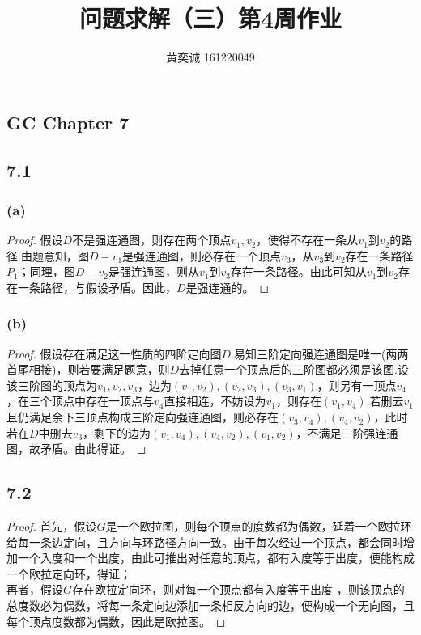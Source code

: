\documentclass[twocolumn]{article}
\newenvironment{SChinese}{%
	\CJKfamily{gbsn}%
	\CJKtilde
	\CJKnospace}{}
\begin{document}
	\begin{CJK}{UTF8}{}	
		\begin{SChinese}	
			\title{问题求解（三）第4周作业}
			\author{黄奕诚 161220049}
			\maketitle
			
			\section*{GC Chapter 7}
				\subsection*{7.1}
				\subsubsection*{(a)}
					\begin{proof}
						假设$D$不是强连通图，则存在两个顶点$v_1,v_2$，使得不存在一条从$v_1$到$v_2$的路径.由题意知，图$D-v_1$是强连通图，则必存在一个顶点$v_3$，从$v_3$到$v_2$存在一条路径$P_1$；同理，图$D-v_2$是强连通图，则从$v_1$到$v_3$存在一条路径。由此可知从$v_1$到$v_2$存在一条路径，与假设矛盾。因此，$D$是强连通的。
					\end{proof}
				\subsubsection*{(b)}
					\begin{proof}
						假设存在满足这一性质的四阶定向图$D$.易知三阶定向强连通图是唯一(两两首尾相接)，则若要满足题意，则$D$去掉任意一个顶点后的三阶图都必须是该图.设该三阶图的顶点为$v_1,v_2,v_3$，边为$(v_1,v_2),(v_2,v_3),(v_3,v_1)$，则另有一顶点$v_4$，在三个顶点中存在一顶点与$v_4$直接相连，不妨设为$v_1$，则存在$(v_1,v_4)$.若删去$v_1$且仍满足余下三顶点构成三阶定向强连通图，则必存在$(v_3,v_4),(v_4,v_2)$，此时若在$D$中删去$v_3$，剩下的边为$(v_1,v_4),(v_4,v_2),(v_1,v_2)$，不满足三阶强连通图，故矛盾。由此得证。
					\end{proof}
				\subsection*{7.2}
					\begin{proof}
						首先，假设$G$是一个欧拉图，则每个顶点的度数都为偶数，延着一个欧拉环给每一条边定向，且方向与环路径方向一致。由于每次经过一个顶点，都会同时增加一个入度和一个出度，由此可推出对任意的顶点，都有入度等于出度，便能构成一个欧拉定向环，得证；\\
						再者，假设$G$存在欧拉定向环，则对每一个顶点都有入度等于出度 ，则该顶点的总度数必为偶数，将每一条定向边添加一条相反方向的边，便构成一个无向图，且每个顶点度数都为偶数，因此是欧拉图。
					\end{proof}

\end{SChinese}
\end{CJK}
\end{document}
